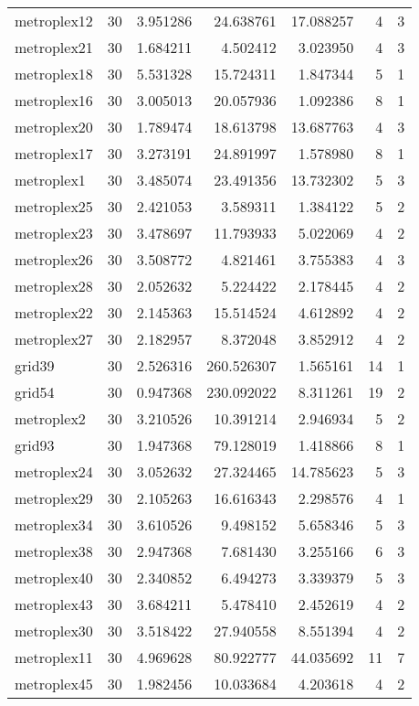 \begin{longtable}{|l|r|r|r|r|r|r|}
metroplex12 & 30 & 3.951286 & 24.638761 & 17.088257 & 4 & 3 \\
metroplex21 & 30 & 1.684211 & 4.502412 & 3.023950 & 4 & 3 \\
metroplex18 & 30 & 5.531328 & 15.724311 & 1.847344 & 5 & 1 \\
metroplex16 & 30 & 3.005013 & 20.057936 & 1.092386 & 8 & 1 \\
metroplex20 & 30 & 1.789474 & 18.613798 & 13.687763 & 4 & 3 \\
metroplex17 & 30 & 3.273191 & 24.891997 & 1.578980 & 8 & 1 \\
metroplex1 & 30 & 3.485074 & 23.491356 & 13.732302 & 5 & 3 \\
metroplex25 & 30 & 2.421053 & 3.589311 & 1.384122 & 5 & 2 \\
metroplex23 & 30 & 3.478697 & 11.793933 & 5.022069 & 4 & 2 \\
metroplex26 & 30 & 3.508772 & 4.821461 & 3.755383 & 4 & 3 \\
metroplex28 & 30 & 2.052632 & 5.224422 & 2.178445 & 4 & 2 \\
metroplex22 & 30 & 2.145363 & 15.514524 & 4.612892 & 4 & 2 \\
metroplex27 & 30 & 2.182957 & 8.372048 & 3.852912 & 4 & 2 \\
grid39 & 30 & 2.526316 & 260.526307 & 1.565161 & 14 & 1 \\
grid54 & 30 & 0.947368 & 230.092022 & 8.311261 & 19 & 2 \\
metroplex2 & 30 & 3.210526 & 10.391214 & 2.946934 & 5 & 2 \\
grid93 & 30 & 1.947368 & 79.128019 & 1.418866 & 8 & 1 \\
metroplex24 & 30 & 3.052632 & 27.324465 & 14.785623 & 5 & 3 \\
metroplex29 & 30 & 2.105263 & 16.616343 & 2.298576 & 4 & 1 \\
metroplex34 & 30 & 3.610526 & 9.498152 & 5.658346 & 5 & 3 \\
metroplex38 & 30 & 2.947368 & 7.681430 & 3.255166 & 6 & 3 \\
metroplex40 & 30 & 2.340852 & 6.494273 & 3.339379 & 5 & 3 \\
metroplex43 & 30 & 3.684211 & 5.478410 & 2.452619 & 4 & 2 \\
metroplex30 & 30 & 3.518422 & 27.940558 & 8.551394 & 4 & 2 \\
metroplex11 & 30 & 4.969628 & 80.922777 & 44.035692 & 11 & 7 \\
metroplex45 & 30 & 1.982456 & 10.033684 & 4.203618 & 4 & 2 \\

\end{longtable}
